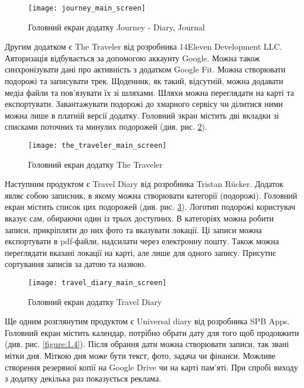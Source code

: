 \documentclass[../main.tex]{subfiles}
\begin{document}
\begin{figure}[H]
\centering
\texttt{[image: journey\_main\_screen]}
\caption{Головний екран додатку Journey - Diary, Journal}
\label{figure:1.1}
\end{figure}

Другим додатком є The Traveler від розробника 14Eleven Development LLC. Авторизація відбувається за допомогою аккаунту Google. Можна також синхронізувати дані про активність з додатком Google Fit. Можна створювати подорожі та записувати трек. Щоденник, як такий, відсутній, можна додавати медіа файли та пов'язувати їх зі шляхами. Шляхи можна переглядати на карті та експортувати. Завантажувати подорожі до хмарного сервісу чи ділитися ними можна лише в платній версії додатку. Головний экран містить дві вкладки зі списками поточних та минулих подорожей (див. рис. \ref{figure:1.2}). 

\begin{figure}[H]
	\centering
	\texttt{[image: the\_traveler\_main\_screen]}
	\caption{Головний екран додатку The Traveler}
	\label{figure:1.2}
\end{figure}

Наступним продуктом є Travel Diary від розробника Tristan Rücker. Додаток являє собою записник, в якому можна створювати категорії (подорожі). Головний екран містить список цих подорожей (див. рис. \ref{figure:1.3}). Логотип подорожі користувач вказує сам, обираючи один із трьох доступних. В категоріях можна робити записи, прикріпляти до них фото та вказувати локації. Ці записи можна експортувати в pdf-файли, надсилати через електронну пошту. Також можна переглядати вказані локації на карті, але лише для одного запису. Присутнє сортування записів за датою та назвою.

\begin{figure}[H]
\centering
\texttt{[image: travel\_diary\_main\_screen]}
\caption{Головний екран додатку Travel Diary}
\label{figure:1.3}
\end{figure}

Ще одним розглянутим продуктом є Universal diary від розробника SPB Apps. Головний екран містить календар, потрібно обрати дату для того щоб продовжити (див. рис. \ref{figure:1.4}). Після обрання дати можна створювати записи, так звані мітки дня. Міткою дня може бути текст, фото, задача чи фінанси. Можливе створення резервної копії на Google Drive чи на карті пам'яті. При спробі виходу з додатку декілька раз показується реклама.
\end{document}
